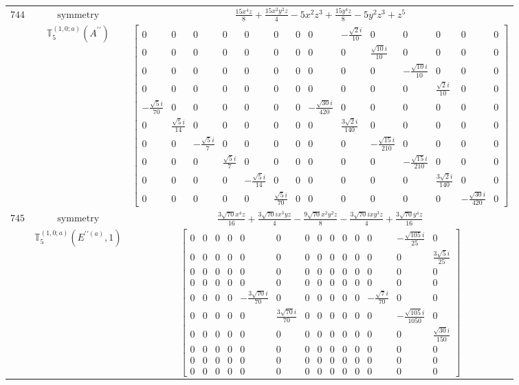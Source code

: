 \documentclass[fleqn,8pt,landscape]{jsarticle}
\begin{document}
\begin{longtable}{ccc}
$ 744 $ & $ \text{symmetry} $ & $ \frac{15 x^{4} z}{8} + \frac{15 x^{2} y^{2} z}{4} - 5 x^{2} z^{3} + \frac{15 y^{4} z}{8} - 5 y^{2} z^{3} + z^{5} $ \\
$  $ & $ \mathbb{T}_{5}^{(1,0;a)}(A^{\prime\prime}) $ & $ \begin{bmatrix} 0 & 0 & 0 & 0 & 0 & 0 & 0 & 0 & - \frac{\sqrt{2} i}{10} & 0 & 0 & 0 & 0 & 0 \\ 0 & 0 & 0 & 0 & 0 & 0 & 0 & 0 & 0 & \frac{\sqrt{10} i}{10} & 0 & 0 & 0 & 0 \\ 0 & 0 & 0 & 0 & 0 & 0 & 0 & 0 & 0 & 0 & - \frac{\sqrt{10} i}{10} & 0 & 0 & 0 \\ 0 & 0 & 0 & 0 & 0 & 0 & 0 & 0 & 0 & 0 & 0 & \frac{\sqrt{2} i}{10} & 0 & 0 \\ - \frac{\sqrt{5} i}{70} & 0 & 0 & 0 & 0 & 0 & 0 & - \frac{\sqrt{30} i}{420} & 0 & 0 & 0 & 0 & 0 & 0 \\ 0 & \frac{\sqrt{5} i}{14} & 0 & 0 & 0 & 0 & 0 & 0 & \frac{3 \sqrt{2} i}{140} & 0 & 0 & 0 & 0 & 0 \\ 0 & 0 & - \frac{\sqrt{5} i}{7} & 0 & 0 & 0 & 0 & 0 & 0 & - \frac{\sqrt{15} i}{210} & 0 & 0 & 0 & 0 \\ 0 & 0 & 0 & \frac{\sqrt{5} i}{7} & 0 & 0 & 0 & 0 & 0 & 0 & - \frac{\sqrt{15} i}{210} & 0 & 0 & 0 \\ 0 & 0 & 0 & 0 & - \frac{\sqrt{5} i}{14} & 0 & 0 & 0 & 0 & 0 & 0 & \frac{3 \sqrt{2} i}{140} & 0 & 0 \\ 0 & 0 & 0 & 0 & 0 & \frac{\sqrt{5} i}{70} & 0 & 0 & 0 & 0 & 0 & 0 & - \frac{\sqrt{30} i}{420} & 0 \end{bmatrix} $ \\ \hline
$ 745 $ & $ \text{symmetry} $ & $ \frac{3 \sqrt{70} x^{4} z}{16} + \frac{3 \sqrt{70} i x^{3} y z}{4} - \frac{9 \sqrt{70} x^{2} y^{2} z}{8} - \frac{3 \sqrt{70} i x y^{3} z}{4} + \frac{3 \sqrt{70} y^{4} z}{16} $ \\
$  $ & $ \mathbb{T}_{5}^{(1,0;a)}(E^{\prime\prime(a)},1) $ & $ \begin{bmatrix} 0 & 0 & 0 & 0 & 0 & 0 & 0 & 0 & 0 & 0 & 0 & 0 & - \frac{\sqrt{105} i}{25} & 0 \\ 0 & 0 & 0 & 0 & 0 & 0 & 0 & 0 & 0 & 0 & 0 & 0 & 0 & \frac{3 \sqrt{5} i}{25} \\ 0 & 0 & 0 & 0 & 0 & 0 & 0 & 0 & 0 & 0 & 0 & 0 & 0 & 0 \\ 0 & 0 & 0 & 0 & 0 & 0 & 0 & 0 & 0 & 0 & 0 & 0 & 0 & 0 \\ 0 & 0 & 0 & 0 & - \frac{3 \sqrt{70} i}{70} & 0 & 0 & 0 & 0 & 0 & 0 & - \frac{\sqrt{7} i}{70} & 0 & 0 \\ 0 & 0 & 0 & 0 & 0 & \frac{3 \sqrt{70} i}{70} & 0 & 0 & 0 & 0 & 0 & 0 & - \frac{\sqrt{105} i}{1050} & 0 \\ 0 & 0 & 0 & 0 & 0 & 0 & 0 & 0 & 0 & 0 & 0 & 0 & 0 & \frac{\sqrt{30} i}{150} \\ 0 & 0 & 0 & 0 & 0 & 0 & 0 & 0 & 0 & 0 & 0 & 0 & 0 & 0 \\ 0 & 0 & 0 & 0 & 0 & 0 & 0 & 0 & 0 & 0 & 0 & 0 & 0 & 0 \\ 0 & 0 & 0 & 0 & 0 & 0 & 0 & 0 & 0 & 0 & 0 & 0 & 0 & 0 \end{bmatrix} $ \\ \hline

\end{longtable}
\end{document}
